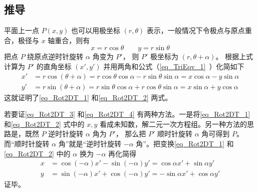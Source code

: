 \subsection{推导}

平面上一点 $P(x,y)$ 也可以用极坐标 $(r, \theta)$ 表示，一般情况下令极点与原点重合，极径与 $x$ 轴重合，则有
\begin{equation}
x = r\cos \theta \qquad y = r\sin \theta 
\end{equation}     
把点 $P$ 绕原点逆时针旋转 $\alpha $ 角变为 $P'$， 则 $P'$ 极坐标为 $(r, \theta  + \alpha)$。 根据上式计算为 $P'$ 的直角坐标 $(x', y')$ 并用两角和公式（\autoref{eq_TriEqv_1}~）化简如下
\begin{align}
x' &= r\cos(\theta  + \alpha) = r\cos\theta \cos\alpha  - r\sin\theta \sin\alpha  = x\cos\alpha  - y\sin\alpha \\
y' &= r\sin(\theta  + \alpha) = r\sin\theta \cos\alpha  + r\cos\theta \sin\alpha  = x\sin\alpha  + y\cos\alpha 
\end{align} 
这就证明了\autoref{eq_Rot2DT_1} 和\autoref{eq_Rot2DT_2} 两式。

若要证\autoref{eq_Rot2DT_3} 和\autoref{eq_Rot2DT_4} 有两种方法。一是将\autoref{eq_Rot2DT_1} 和\autoref{eq_Rot2DT_2} 式中的 $x, y$ 看成未知数，解二元一次方程组。另一种方法的思路是，既然 $P$ 逆时针旋转 $\alpha $ 角为 $P'$， 那么把 $P'$ 顺时针旋转 $\alpha$ 角可得到 $P$。 而“顺时针旋转 $\alpha$ 角”就是“逆时针旋转 $-\alpha $ 角”。把变换\autoref{eq_Rot2DT_1} 和\autoref{eq_Rot2DT_2} 中的 $\alpha$ 换为 $-\alpha$ 再化简得
 \begin{align}
x &= \cos(-\alpha) x' - \sin(-\alpha) y' = \cos\alpha x' + \sin\alpha y'\\
y &= \sin(-\alpha) x' + \cos(-\alpha) y' =  -\sin\alpha x' + \cos\alpha y'
\end{align}
证毕。
